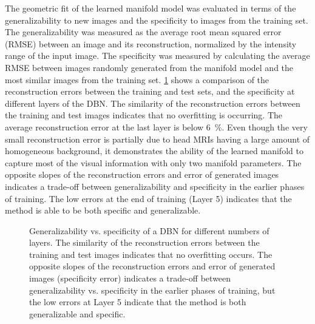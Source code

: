 The geometric fit of the learned manifold model was evaluated in terms of the
generalizability to new images and the specificity to images from the training
set. The generalizability was measured as the average root mean squared error
(RMSE) between an image and its reconstruction, normalized by the intensity
range of the input image. The specificity was measured by calculating the
average RMSE between images randomly generated from the manifold model and the
most similar images from the training set. \ref{fig:genspe} shows a
comparison of the reconstruction errors between the training and test sets, and
the specificity at different layers of the DBN. The similarity of the
reconstruction errors between the training and test images indicates that no
overfitting is occurring. The average reconstruction error at the last layer is
below \SI{6}{\percent}. Even though the very small reconstruction error is
partially due to head MRIs having a large amount of homogeneous background, it
demonstrates the ability of the learned manifold to capture most of the visual
information with only two manifold parameters. The opposite slopes of the
reconstruction errors and error of generated images indicates a trade-off
between generalizability and specificity in the earlier phases of training. The
low errors at the end of training (Layer 5) indicates that the method is able to
be both specific and generalizable.

\begin{figure}[tb]
\centering
  

\caption[Generalizability vs. specificity of a DBN for different numbers of
layers]{Generalizability vs. specificity of a DBN for different numbers of
layers. The similarity of the reconstruction errors between the training and
test images indicates that no overfitting occurs. The opposite slopes of the reconstruction errors and error of generated images (specificity error)
indicates a trade-off between generalizability vs. specificity in the earlier
phases of training, but the low errors at Layer 5 indicate that the method is
both generalizable and specific.}
\label{fig:genspe}
\end{figure}

